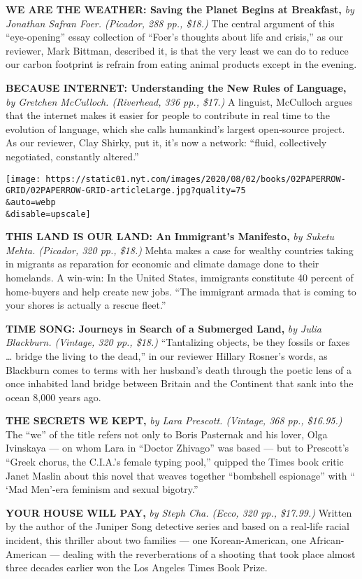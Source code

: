 \textbf{\textbf{WE ARE THE WEATHER: Saving the Planet Begins at
Breakfast,}} \emph{by Jonathan Safran Foer. (Picador, 288 pp., \$18.)}
The central argument of this ``eye-opening'' essay collection of
``Foer's thoughts about life and crisis,'' as our reviewer, Mark
Bittman, described it, is that the very least we can do to reduce our
carbon footprint is refrain from eating animal products except in the
evening.

\textbf{\textbf{BECAUSE INTERNET: Understanding the New Rules of
Language,}} \emph{by Gretchen McCulloch. (Riverhead, 336 pp., \$17.)} A
linguist, McCulloch argues that the internet makes it easier for people
to contribute in real time to the evolution of language, which she calls
humankind's largest open-source project. As our reviewer, Clay Shirky,
put it, it's now a network: ``fluid, collectively negotiated, constantly
altered.''

\texttt{[image: https://static01.nyt.com/images/2020/08/02/books/02PAPERROW-GRID/02PAPERROW-GRID-articleLarge.jpg?quality=75\\\&auto=webp\\\&disable=upscale]}

\textbf{\textbf{THIS LAND IS OUR LAND: An Immigrant's Manifesto,}}
\emph{by Suketu Mehta. (Picador, 320 pp., \$18.)} Mehta makes a case for
wealthy countries taking in migrants as reparation for economic and
climate damage done to their homelands. A win-win: In the United States,
immigrants constitute 40 percent of home-buyers and help create new
jobs. ``The immigrant armada that is coming to your shores is actually a
rescue fleet.''

\textbf{\textbf{TIME SONG: Journeys in Search of a Submerged Land,}}
\emph{by Julia Blackburn. (Vintage, 320 pp., \$18.)} ``Tantalizing
objects, be they fossils or faxes \ldots{} bridge the living to the
dead,'' in our reviewer Hillary Rosner's words, as Blackburn comes to
terms with her husband's death through the poetic lens of a once
inhabited land bridge between Britain and the Continent that sank into
the ocean 8,000 years ago.

\textbf{\textbf{THE SECRETS WE KEPT,}} \emph{by Lara Prescott. (Vintage,
368 pp., \$16.95.)} The ``we'' of the title refers not only to Boris
Pasternak and his lover, Olga Ivinskaya --- on whom Lara in ``Doctor
Zhivago'' was based --- but to Prescott's ``Greek chorus, the C.I.A.'s
female typing pool,'' quipped the Times book critic Janet Maslin about
this novel that weaves together ``bombshell espionage'' with `` `Mad
Men'-era feminism and sexual bigotry.''

\textbf{\textbf{YOUR HOUSE WILL PAY,}} \emph{by Steph Cha. (Ecco, 320
pp., \$17.99.)} Written by the author of the Juniper Song detective
series and based on a real-life racial incident, this thriller about two
families --- one Korean-American, one African-American --- dealing with
the reverberations of a shooting that took place almost three decades
earlier won the Los Angeles Times Book Prize.

